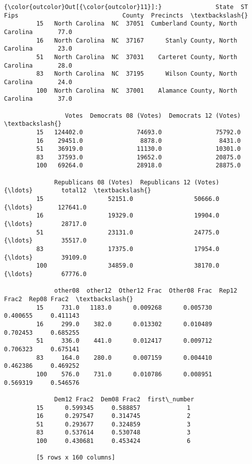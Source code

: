 \documentclass[11pt]{article}
\begin{document}
\begin{Verbatim}[commandchars=\\\{\}]
{\color{outcolor}Out[{\color{outcolor}11}]:}               State  ST   Fips                             County  Precincts  \textbackslash{}
         15   North Carolina  NC  37051  Cumberland County, North Carolina       77.0   
         16   North Carolina  NC  37167      Stanly County, North Carolina       23.0   
         51   North Carolina  NC  37031    Carteret County, North Carolina       28.0   
         83   North Carolina  NC  37195      Wilson County, North Carolina       24.0   
         100  North Carolina  NC  37001    Alamance County, North Carolina       37.0   
         
                 Votes  Democrats 08 (Votes)  Democrats 12 (Votes)  \textbackslash{}
         15   124402.0               74693.0               75792.0   
         16    29451.0                8878.0                8431.0   
         51    36919.0               11130.0               10301.0   
         83    37593.0               19652.0               20875.0   
         100   69264.0               28918.0               28875.0   
         
              Republicans 08 (Votes)  Republicans 12 (Votes)      {\ldots}        total12  \textbackslash{}
         15                  52151.0                 50666.0      {\ldots}       127641.0   
         16                  19329.0                 19904.0      {\ldots}        28717.0   
         51                  23131.0                 24775.0      {\ldots}        35517.0   
         83                  17375.0                 17954.0      {\ldots}        39109.0   
         100                 34859.0                 38170.0      {\ldots}        67776.0   
         
              other08  other12  Other12 Frac  Other08 Frac  Rep12 Frac2  Rep08 Frac2  \textbackslash{}
         15     731.0   1183.0      0.009268      0.005730     0.400655     0.411143   
         16     299.0    382.0      0.013302      0.010489     0.702453     0.685255   
         51     336.0    441.0      0.012417      0.009712     0.706323     0.675141   
         83     164.0    280.0      0.007159      0.004410     0.462386     0.469252   
         100    576.0    731.0      0.010786      0.008951     0.569319     0.546576   
         
              Dem12 Frac2  Dem08 Frac2  first\_number  
         15      0.599345     0.588857             1  
         16      0.297547     0.314745             2  
         51      0.293677     0.324859             3  
         83      0.537614     0.530748             3  
         100     0.430681     0.453424             6  
         
         [5 rows x 160 columns]
\end{Verbatim}
            
\end{document}
